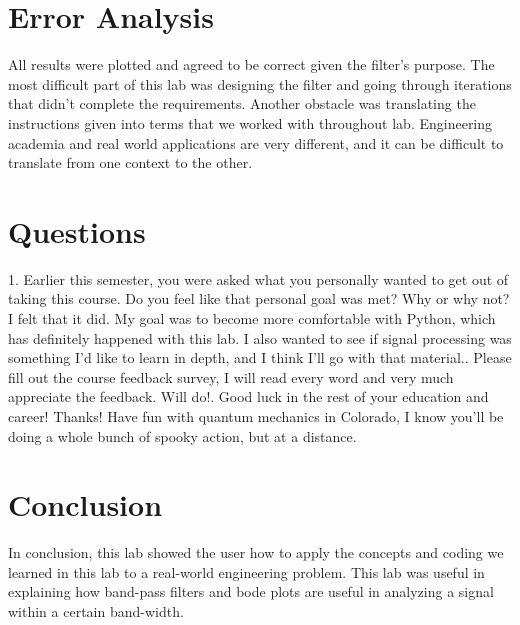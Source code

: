 \documentclass[12pt]{article}
\begin{document}
\section{Error Analysis}
All results were plotted and agreed to be correct given the filter's purpose. The most difficult part of this lab was designing the filter and going through iterations that didn't complete the requirements. Another obstacle was translating the instructions given into terms that we worked with throughout lab. Engineering academia and real world applications are very different, and it can be difficult to translate from one context to the other.

\section{Questions}
1. Earlier this semester, you were asked what you personally wanted to get out of taking this
course. Do you feel like that personal goal was met? Why or why not?\newline
I felt that it did. My goal was to become more comfortable with Python, which has definitely happened with this lab. I also wanted to see if signal processing was something I'd like to learn in depth, and I think I'll go with that material.. Please fill out the course feedback survey, I will read every word and very much appreciate
the feedback.\newline
Will do!. Good luck in the rest of your education and career!\newline
Thanks! Have fun with quantum mechanics in Colorado, I know you'll be doing a whole bunch of spooky action, but at a distance. 

\section{Conclusion}
In conclusion, this lab showed the user how to apply the concepts and coding we learned in this lab to a real-world engineering problem. This lab was useful in explaining how band-pass filters and bode plots are useful in analyzing a signal within a certain band-width.
\end{document}
